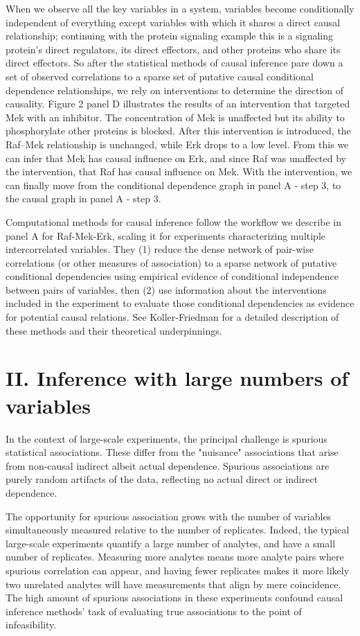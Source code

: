 \documentclass[journal=jacsat,manuscript=article]{achemso}
\begin{document}
When we observe all the key variables in a system, variables become conditionally independent of everything except variables with which it shares a direct causal relationship; continuing with the protein signaling example this is a signaling protein's direct regulators, its direct effectors, and other proteins who share its direct effectors.  So after the statistical methods of causal inference pare down a set of observed correlations to a sparse set of putative causal conditional dependence relationships, we rely on interventions to determine the direction of causality.  Figure 2 panel D illustrates the results of an intervention that targeted Mek with an inhibitor.  The concentration of Mek is unaffected but its ability to phosphorylate other proteins is blocked.  After this intervention is introduced, the Raf--Mek relationship is unchanged, while Erk drops to a low level.  From this we can infer that Mek has causal influence on Erk, and since Raf was unaffected by the intervention, that Raf has causal influence on Mek.  With the intervention, we can finally move from the conditional dependence graph in panel A - step 3, to the causal graph in panel A - step 3.

Computational methods for  causal inference follow the workflow  we describe in panel A for Raf-Mek-Erk, scaling it for experiments characterizing multiple intercorrelated variables. They (1) reduce the dense network of pair-wise correlations (or other measures of association) to a sparse network of putative conditional dependencies using empirical evidence of  conditional independence between pairs of variables,  then (2) use information about the interventions included in the experiment to evaluate those conditional dependencies as evidence for potential causal relations.  See Koller-Friedman for a detailed description of these methods and their theoretical underpinnings.

\section{II. Inference with large numbers of variables}

In the context of large-scale experiments, the principal challenge is spurious statistical associations.  These differ from the "nuisance" associations that arise from non-causal indirect albeit actual dependence.  Spurious associations are purely random artifacts of the data, reflecting no actual direct or indirect dependence.

The opportunity for spurious association grows with the number of variables simultaneously measured relative to the number of replicates.  Indeed, the typical large-scale experiments quantify a large number of analytes, and have a small number of replicates.  Measuring more analytes means more analyte pairs where spurious correlation can appear, and having fewer replicates makes it more likely two unrelated analytes will have measurements that align by mere coincidence. The high amount of spurious associations in these experiments confound causal inference methods' task of evaluating true associations to the point of infeasibility.
\end{document}
